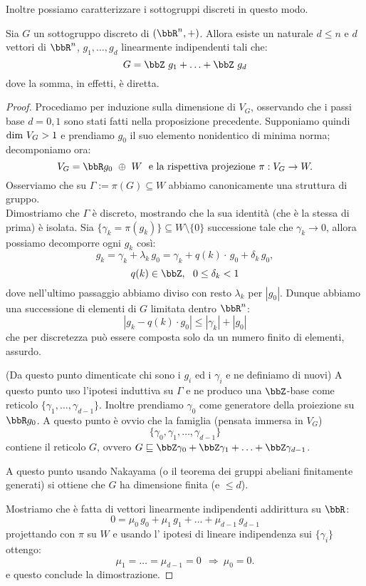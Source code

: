 Inoltre possiamo caratterizzare i sottogruppi discreti in questo modo.
\begin{teorema}\label{sgr_discreti}
    Sia $G$ un sottogruppo discreto di $(\bbR^n,+)$. Allora esiste un naturale $d\leq n$ e $d$ vettori di $\bbR^n$, $g_1,\ldots,g_d$ linearmente indipendenti tali che:
$$
G=\bbZ\ g_1+\ldots+\bbZ\ g_d
$$
dove la somma, in effetti, è diretta.
\end{teorema}
\begin{proof}
Procediamo per induzione sulla dimensione di $V_G$, osservando che i passi base $d=0,1$ sono stati fatti nella proposizione precedente. Supponiamo quindi $\mbox{dim }{V_G}>1$ e prendiamo $g_0$ il suo elemento nonidentico di minima norma; decomponiamo ora:
$$
V_G=\bbR g_0\ \oplus\  W\ \mbox{ e la rispettiva projezione}\ \pi:V_G\rightarrow W.
$$
Osserviamo che su $\Gamma:=\pi(G)\subseteq W$ abbiamo canonicamente una struttura di gruppo.\\
Dimostriamo che $\Gamma$ è discreto, mostrando che la sua identità (che è la stessa di prima) è isolata. Sia $\{\gamma_k=\pi(g_k)\}\subseteq W\setminus\{0\}$ successione tale che $\gamma_k\rightarrow 0$, allora possiamo decomporre ogni $g_k$ così:
$$
g_k=\gamma_k+\lambda_k\, g_0=\gamma_k+q(k)\cdot\, g_0+\delta_k\, g_0,
$$
$$
q(k)\in\bbZ,\ \ 0\leq \delta_k<1
$$
dove nell'ultimo passaggio abbiamo diviso con resto $\lambda_k$ per $|g_0|$. Dunque abbiamo una successione di elementi di $G$ limitata dentro $\bbR^n$:
$$
|g_k-q(k)\cdot g_0| \leq |\gamma_k|+|g_0|
$$
che per discretezza può essere composta solo da un numero finito di elementi, assurdo.

(Da questo punto dimenticate chi sono i $g_i$ ed i $\gamma_i$ e ne definiamo di nuovi)
A questo punto uso l'ipotesi induttiva su $\Gamma$ e ne produco una $\bbZ$-base come reticolo $\{\gamma_1, \ldots, \gamma_{d-1}\}$.
Inoltre prendiamo $\gamma_0$ come generatore della proiezione su $\bbR g_0$.
A questo punto è ovvio che la famiglia (pensata immersa in $V_G$)
$$
\{\gamma_0,\gamma_1,\ldots,\gamma_{d-1}\}
$$
contiene il reticolo $G$, ovvero $G \sqsubseteq \bbZ \gamma_0 + \bbZ \gamma_1 + \ldots + \bbZ \gamma_{d-1}$.

A questo punto usando Nakayama (o il teorema dei gruppi abeliani finitamente generati) si ottiene che $G$ ha dimensione finita (e $\le d$).

Mostriamo che è fatta di vettori linearmente indipendenti addirittura su $\bbR$:
$$
0=\mu_0\, g_0+\mu_1\, g_1+\ldots+\mu_{d-1}\, g_{d-1}
$$
projettando con $\pi$ su $W$ e usando l' ipotesi di lineare indipendenza sui $\{\gamma_i\}$ ottengo:
$$
\mu_1=\ldots=\mu_{d-1}=0\ \ \Rightarrow\  \mu_0=0.
$$
e questo conclude la dimostrazione.
\end{proof}

